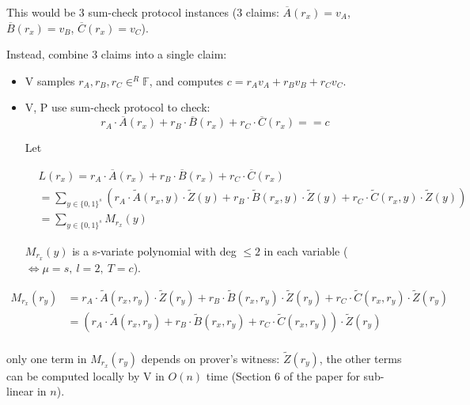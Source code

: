 \documentclass{article}
\theoremstyle{definition}
\begin{document}
\vspace{0.5cm}

This would be 3 sum-check protocol instances (3 claims: $\overline{A}(r_x)=v_A$, $\overline{B}(r_x)=v_B$, $\overline{C}(r_x)=v_C$).

Instead, combine 3 claims into a single claim:

\begin{itemize}
	\item V samples $r_A, r_B, r_C \in^R \mathbb{F}$, and computes $c= r_A v_A + r_B v_B + r_C v_C$.
	\item V, P use sum-check protocol to check:
$$r_A \cdot \overline{A}(r_x) + r_B \cdot \overline{B}(r_x) + r_C \cdot \overline{C}(r_x) == c$$


Let
\begin{small}
\begin{align*}
	&L(r_x) = r_A \cdot \overline{A}(r_x) +r_B \cdot \overline{B}(r_x) +r_C \cdot \overline{C}(r_x)\\
	&= \sum_{y \in \{0,1\}^s}
	       \left( r_A \cdot \widetilde{A}(r_x, y) \cdot \widetilde{Z}(y)
	       + r_B \cdot \widetilde{B}(r_x, y) \cdot \widetilde{Z}(y)
	       + r_C \cdot \widetilde{C}(r_x, y) \cdot \widetilde{Z}(y) \right)\\
	       &= \sum_{y \in \{0,1\}^s} M_{r_x}(y)
\end{align*}
\end{small}

$M_{r_x}(y)$ is a s-variate polynomial with deg $\leq 2$ in each variable ($\Longleftrightarrow \mu = s,~ l=2,~ T=c$).

\end{itemize}


\begin{align*}
M_{r_x}(r_y) &=
r_A \cdot \widetilde{A}(r_x, r_y) \cdot \widetilde{Z}(r_y)
+ r_B \cdot \widetilde{B}(r_x, r_y) \cdot \widetilde{Z}(r_y)
+ r_C \cdot \widetilde{C}(r_x, r_y) \cdot \widetilde{Z}(r_y)\\
	     &=
	     (r_A \cdot \widetilde{A}(r_x, r_y)
+ r_B \cdot \widetilde{B}(r_x, r_y)
+ r_C \cdot \widetilde{C}(r_x, r_y)) \cdot \widetilde{Z}(r_y)\\
\end{align*}

only one term in $M_{r_x}(r_y)$ depends on prover's witness: $\widetilde{Z}(r_y)$, the other terms can be computed locally by V in $O(n)$ time (Section 6 of the paper for sub-linear in $n$).
\end{document}
